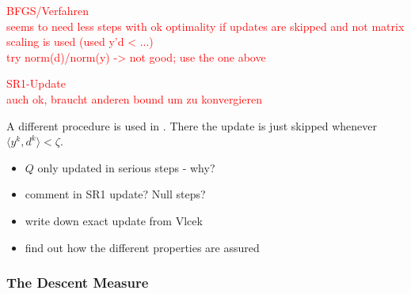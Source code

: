 \textcolor{red}{BFGS/Verfahren\\
seems to need less steps with ok optimality if updates are skipped and not matrix scaling is used (used y'd < ...)\\
try norm(d)/norm(y) -> not good; use the one above}

\textcolor{red}{SR1-Update\\
auch ok, braucht anderen bound um zu konvergieren}


 

A different procedure is used in \cite{Vlcek2001}. There the update is just skipped whenever \(\langle y^k, d^k \rangle < \zeta\).


\begin{itemize}
	\item \(Q\) only updated in serious steps - why?
	\item comment in SR1 update? Null steps?
	\item write down exact update from Vlcek
	\item find out how the different properties are assured
\end{itemize}





\subsubsection{The Descent Measure}

